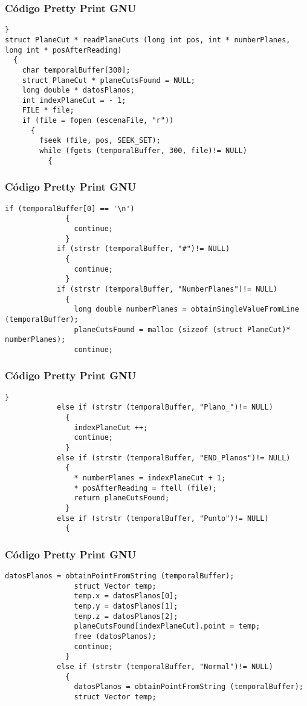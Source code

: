 \documentclass{beamer}
\begin{document}
\begin{frame}[fragile]
\frametitle{C\'odigo Pretty Print GNU}
\begin{lstlisting}[style=CStyle]
  }
struct PlaneCut * readPlaneCuts (long int pos, int * numberPlanes, long int * posAfterReading)
  {
    char temporalBuffer[300];
    struct PlaneCut * planeCutsFound = NULL;
    long double * datosPlanos;
    int indexPlaneCut = - 1;
    FILE * file;
    if (file = fopen (escenaFile, "r"))
      {
        fseek (file, pos, SEEK_SET);
        while (fgets (temporalBuffer, 300, file)!= NULL)
          {
            \end{lstlisting}
\end{frame}
\begin{frame}[fragile]
\frametitle{C\'odigo Pretty Print GNU}
\begin{lstlisting}[style=CStyle]
            if (temporalBuffer[0] == '\n')
              {
                continue;
              }
            if (strstr (temporalBuffer, "#")!= NULL)
              {
                continue;
              }
            if (strstr (temporalBuffer, "NumberPlanes")!= NULL)
              {
                long double numberPlanes = obtainSingleValueFromLine (temporalBuffer);
                planeCutsFound = malloc (sizeof (struct PlaneCut)* numberPlanes);
                continue;
\end{lstlisting}
\end{frame}
\begin{frame}[fragile]
\frametitle{C\'odigo Pretty Print GNU}
\begin{lstlisting}[style=CStyle]
              }
            else if (strstr (temporalBuffer, "Plano_")!= NULL)
              {
                indexPlaneCut ++;
                continue;
              }
            else if (strstr (temporalBuffer, "END_Planos")!= NULL)
              {
                * numberPlanes = indexPlaneCut + 1;
                * posAfterReading = ftell (file);
                return planeCutsFound;
              }
            else if (strstr (temporalBuffer, "Punto")!= NULL)
              {
                \end{lstlisting}
\end{frame}
\begin{frame}[fragile]
\frametitle{C\'odigo Pretty Print GNU}
\begin{lstlisting}[style=CStyle]
                datosPlanos = obtainPointFromString (temporalBuffer);
                struct Vector temp;
                temp.x = datosPlanos[0];
                temp.y = datosPlanos[1];
                temp.z = datosPlanos[2];
                planeCutsFound[indexPlaneCut].point = temp;
                free (datosPlanos);
                continue;
              }
            else if (strstr (temporalBuffer, "Normal")!= NULL)
              {
                datosPlanos = obtainPointFromString (temporalBuffer);
                struct Vector temp;
\end{lstlisting}
\end{frame}
\end{document}
